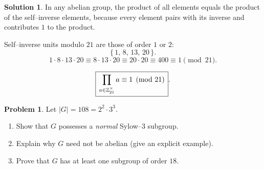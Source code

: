 \documentclass[12pt]{article}
\theoremstyle{definition} %
\newtheorem{solution}{Solution}
\newtheorem{problem}{Problem}
\theoremstyle{plain} %
\begin{document}
\begin{solution}
      In any abelian group, the product of all elements equals the product of
      the self–inverse elements, because every element pairs with its inverse
      and contributes \(1\) to the product.
      
      Self–inverse units modulo \(21\) are those of order \(1\) or \(2\):
      \[
         \{\,1,\,8,\,13,\,20\,\}.
      \]
      \[
         1\cdot8\cdot13\cdot20
           \equiv 8\cdot13\cdot20
           \equiv 20\cdot20
           \equiv 400
           \equiv 1 \pmod{21}.
      \]
      
      \[
         \boxed{\,\displaystyle\prod_{a\in\Bbb Z_{21}^{\times}} a \equiv 1
                \pmod{21}\, }.
      \]
      \end{solution}
      \begin{problem}
        Let \(|G| = 108 = 2^{2}\cdot 3^{3}\).
        \begin{enumerate}[]
           \item Show that \(G\) possesses a \emph{normal} Sylow–\(3\) subgroup.
           \item Explain why \(G\) need not be abelian (give an explicit example).
           \item Prove that \(G\) has at least one subgroup of order \(18\).
        \end{enumerate}
        \end{problem}
        
\end{document}
